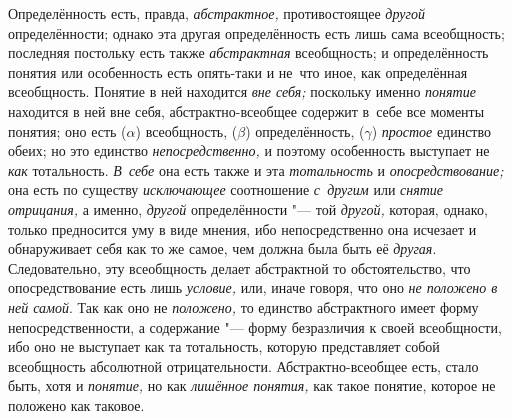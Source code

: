 Определённость есть, правда, {\em абстрактное,} противостоящее {\em другой}
определённости; однако эта другая определённость есть лишь
сама всеобщность; последняя постольку есть также {\em абстрактная}
всеобщность; и определённость понятия или особенность есть
опять-таки и не~что иное, как определённая всеобщность. Понятие в ней
находится {\em вне себя;} поскольку именно {\em понятие} находится в
ней вне себя, абстрактно-всеобщее содержит в~себе все моменты понятия; оно
есть ($\alpha $) всеобщность, ($\beta $) определённость, ($\gamma $)
{\em простое} единство обеих; но это единство {\em непосредственно,} и
поэтому особенность выступает не {\em как} тотальность. {\em В~себе} она есть
также и эта {\em тотальность} и {\em опосредствование;}
она есть по существу {\em исключающее} соотношение {\em с~другим} или
{\em снятие отрицания,} а именно, {\em другой} определённости "--- той
{\em другой,} которая, однако, только предносится уму в виде мнения, ибо
непосредственно она исчезает и обнаруживает себя как то же самое, чем должна
была быть её {\em другая}. Следовательно, эту всеобщность делает абстрактной
то обстоятельство, что опосредствование есть лишь {\em условие,} или, иначе
говоря, что оно {\em не положено в ней самой}. Так как оно не {\em положено,}
то единство абстрактного имеет форму непосредственности, а содержание
"--- форму безразличия к своей всеобщности, ибо оно не выступает
как та тотальность, которую представляет собой всеобщность абсолютной
отрицательности. Абстрактно-всеобщее есть, стало быть, хотя и
{\em понятие,} но как {\em лишённое понятия,}
как такое понятие, которое не положено как таковое.


